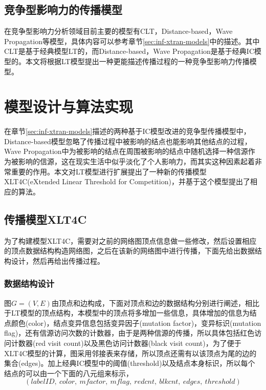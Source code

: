 
\subsection{竞争型影响力的传播模型}
在竞争型影响力分析领域目前主要的模型有CLT，Distance-based，Wave Propagation等模型，具体内容可以参考章节\ref{sec:inf-xtran-models}中的描述。其中CLT是基于经典模型LT的，而Distance-based，Wave Propagation是基于经典IC模型的。本文将根据LT模型提出一种更能描述传播过程的一种竞争型影响力传播模型。


\section{模型设计与算法实现}
在章节\ref{sec:inf-xtran-models}描述的两种基于IC模型改进的竞争型传播模型中，Distance-based模型忽略了传播过程中被影响的结点也能影响其他结点的过程，Wave Propagation中为被影响的结点在周围被影响的结点中随机选择一种信源作为被影响的信源，这在现实生活中似乎淡化了个人影响力，而其实这种因素起着非常重要的作用。本文对LT模型进行扩展提出了一种新的传播模型XLT4C(eXtended Linear Threshold for Competition)，并基于这个模型提出了相应的算法。


\subsection{传播模型XLT4C}
为了构建模型XLT4C，需要对之前的网络图顶点信息做一些修改，然后设置相应的顶点数据结构构造网络图，之后在该新的网络图中进行传播，下面先给出数据结构设计，然后再给出传播过程。

\subsubsection{数据结构设计}
\label{sec:xlt4c:ds-design}
图$G=(V,E)$由顶点和边构成，下面对顶点和边的数据结构分别进行阐述，相比于LT模型的顶点结构，本模型中的顶点将多增加一些信息，具体增加的信息为结点颜色(color)，结点变异信息包括变异因子(mutation factor)，变异标识(mutation flag)，还有信源访问次数的计数器，由于是两种信源的传播，所以具体包括红色访问计数器(red visit count)以及黑色访问计数器(black visit count)，为了便于XLT4C模型的计算，图采用邻接表来存储，所以顶点还需有以该顶点为尾的边的集合(edges)。加上经典IC模型中的阈值(threshold)以及结点本身标识，所以每个结点的可以由一个下面的八元组来标示，
\begin{displaymath}
(labelID, ~color, ~mfactor, ~mflag, ~redcnt, ~blkcnt, ~edges, ~threshold)
\end{displaymath}


